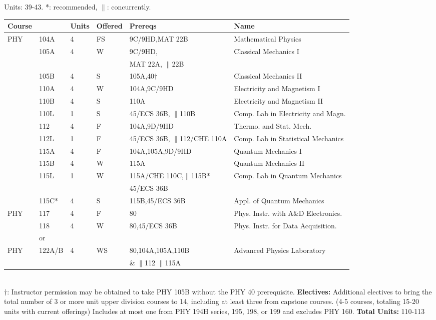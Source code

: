 \documentclass[12pt]{article}
\begin{document}
\newpage
\vskip 2cm
\vskip 0.5cm
\noindent
Units:  39-43. *: recommended, $\parallel$: concurrently.\\
\begin{tabular}{|llllll|}
\hline
Course & & Units & Offered & Prereqs & Name \\
\hline

PHY & 104A & 4 & FS & 9C/9HD,MAT 22B   & Mathematical Physics \\ 
    & 105A & 4 & W & 9C/9HD, & Classical Mechanics I\\
    &      &   &   & MAT 22A, $\parallel$22B & \\
    & 105B & 4 & S & 105A,40$\dagger$          & Classical Mechanics II\\ 
    & 110A & 4 & W & 104A,9C/9HD             & Electricity and Magnetism I\\
    & 110B & 4 & S & 110A                     & Electricity and Magnetism II\\
    & 110L & 1 & S & 45/ECS 36B, $\parallel$110B & Comp. Lab in Electricity and Magn. \\
    & 112  & 4 & F & 104A,9D/9HD      & Thermo. and Stat. Mech.\\    
    & 112L & 1 & F & 45/ECS 36B, $\parallel$112/CHE 110A  & Comp. Lab in Statistical Mechanics \\ 
    & 115A & 4 & F & 104A,105A,9D/9HD & Quantum Mechanics I \\
    & 115B & 4 & W & 115A             & Quantum Mechanics II \\
    & 115L & 1 & W & 115A/CHE 110C,$\parallel$115B*  & Comp. Lab in Quantum Mechanics \\
           & & & & 45/ECS 36B & \\
    & 115C* & 4 & S & 115B,45/ECS 36B& Appl. of Quantum Mechanics\\ 
\hline
\hline
PHY & 117 & 4 &  F & 80              & Phys. Instr. with A\&D Electronics.  \\
    & 118 & 4 &  W & 80,45/ECS 36B   & Phys. Instr. for Data Acquisition. \\ 
\hline
    & or & & & & \\
\hline
PHY & 122A/B & 4 & WS & 80,104A,105A,110B & Advanced Physics Laboratory \\  
    &  & & & \& $\parallel$112 $\parallel$115A&  \\  
\hline
\end{tabular}\\ 
\noindent
$\dagger$:  Instructor permission may be obtained to take PHY 105B without the PHY 40 prerequisite.
\noindent
{\bf Electives:} Additional electives to bring the total number of 3
or more unit upper division courses to 14, including at least three
from capstone courses.  (4-5 courses, totaling 15-20 units with
current offerings) Includes at most one from PHY 194H series, 195, 198, or 199
and excludes PHY 160.
\noindent
{\bf Total Units:} 110-113
\end{document}
